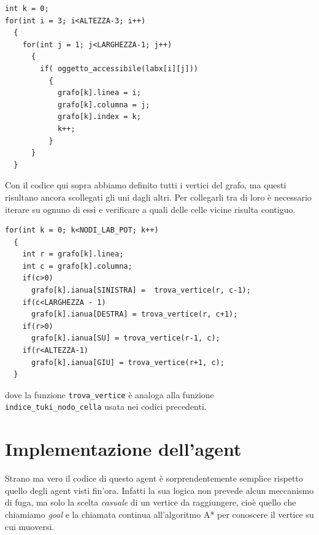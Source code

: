 \documentclass[8pt]{book}
\begin{document}
\begin{spacing}{0.9}
  \begin{small}
    \begin{tcolorbox}
\begin{verbatim}
int k = 0;
for(int i = 3; i<ALTEZZA-3; i++)
  {
    for(int j = 1; j<LARGHEZZA-1; j++)
      {
        if( oggetto_accessibile(labx[i][j]))
          {
            grafo[k].linea = i;
            grafo[k].columna = j;
            grafo[k].index = k;
            k++;
          }
      } 
  }
\end{verbatim}
  \end{tcolorbox}
    \end{small}
      \end{spacing}

Con il codice qui sopra abbiamo definito tutti i vertici del grafo, ma questi risultano ancora scollegati gli uni dagli altri. Per collegarli tra di loro è necessario iterare su ognuno di essi e verificare a quali delle celle vicine risulta contiguo.

\begin{spacing}{0.9}
  \begin{small}
    \begin{tcolorbox}
\begin{verbatim}
for(int k = 0; k<NODI_LAB_POT; k++)
  {
    int r = grafo[k].linea;
    int c = grafo[k].columna;
    if(c>0)
      grafo[k].ianua[SINISTRA] =  trova_vertice(r, c-1);
    if(c<LARGHEZZA - 1)
      grafo[k].ianua[DESTRA] = trova_vertice(r, c+1);
    if(r>0)
      grafo[k].ianua[SU] = trova_vertice(r-1, c);
    if(r<ALTEZZA-1)
      grafo[k].ianua[GIU] = trova_vertice(r+1, c);
  } 
\end{verbatim}
  \end{tcolorbox}
    \end{small}
      \end{spacing}

dove la funzione \texttt{trova\_vertice} è analoga alla funzione \\\texttt{indice\_tuki\_nodo\_cella} usata nei codici precedenti.

\section{Implementazione dell'agent}\label{tocux5f88}

Strano ma vero il codice di questo agent è sorprendentemente semplice rispetto quello degli agent visti fin'ora. Infatti la sua logica non prevede alcun meccanismo di fuga, ma solo la scelta \emph{casuale} di un vertice da raggiungere, cioè quello che chiamiamo \emph{goal} e la chiamata continua all'algoritmo A* per conoscere il vertice su cui muoversi.
\end{document}
